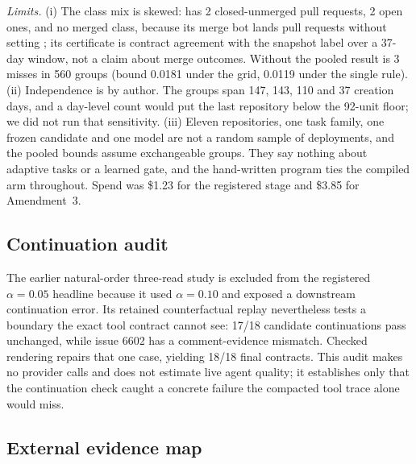 \emph{Limits.} (i) The class mix is skewed:  has 2
closed-unmerged pull requests,  2 open ones, and
 no merged class, because its merge bot lands pull requests
without setting ; its certificate is contract agreement with the
snapshot label over a 37-day window, not a claim about merge outcomes. Without
 the pooled result is 3 misses in 560 groups (bound 0.0181 under
the grid, 0.0119 under the single rule). (ii) Independence is by author. The groups
span 147, 143, 110 and 37 creation days, and a day-level count would put the last
repository below the 92-unit floor; we did not run that sensitivity. (iii) Eleven
repositories, one task family, one frozen candidate and one model are not a
random sample of deployments, and the pooled bounds assume exchangeable groups.
They say nothing about adaptive tasks or a learned gate, and the hand-written
program ties the compiled arm throughout. Spend was \$1.23 for the registered
stage and \$3.85 for Amendment~3.

\subsection{Continuation audit}

The earlier natural-order three-read study is excluded from the registered
$\alpha=0.05$ headline because it used $\alpha=0.10$ and exposed a downstream
continuation error. Its retained counterfactual replay nevertheless tests a
boundary the exact tool contract cannot see: 17/18 candidate continuations pass
unchanged, while issue 6602 has a comment-evidence mismatch. Checked rendering
repairs that one case, yielding 18/18 final contracts. This audit makes no
provider calls and does not estimate live agent quality; it establishes only
that the continuation check caught a concrete failure the compacted tool trace
alone would miss.

\subsection{External evidence map}
\label{app:external}

\begin{table}[t]
  \centering
  \caption{All four trace benchmarks used as compiler substrates. NESTFUL and
  AppWorld are discussed in \cref{sec:res-refusal}; API-Bank and executed BFCL
  v4 gold plans retire on support exactly like NESTFUL. Columns as in
  \cref{tab:funnel}.}
  \label{tab:funnel-all}
  \footnotesize
  \setlength{\tabcolsep}{4pt}
  
\end{table}


